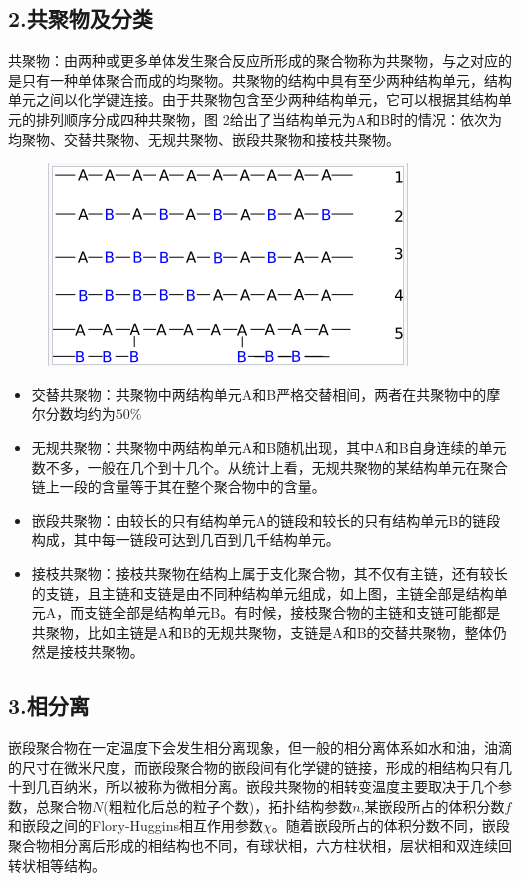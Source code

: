 \documentclass{article}
\begin{document}
\subsection{2.共聚物及分类}
共聚物\cite{Wikipedia}：由两种或更多单体发生聚合反应所形成的聚合物称为共聚物，与之对应的是只有一种单体聚合而成的均聚物。共聚物的结构中具有至少两种结构单元，结构单元之间以化学键连接。由于共聚物包含至少两种结构单元，它可以根据其结构单元的排列顺序分成四种共聚物，图 2给出了当结构单元为A和B时的情况：依次为均聚物、交替共聚物、无规共聚物、嵌段共聚物和接枝共聚物。

\begin{figure}[H]
\centering
\includegraphics[scale=0.5]{./figures/Figure_25.png}
\caption{}
\end{figure}
\begin{itemize}
\item 交替共聚物：共聚物中两结构单元A和B严格交替相间，两者在共聚物中的摩尔分数均约为$50\%$
\item 无规共聚物：共聚物中两结构单元A和B随机出现，其中A和B自身连续的单元数不多，一般在几个到十几个。从统计上看，无规共聚物的某结构单元在聚合链上一段的含量等于其在整个聚合物中的含量。
\item 嵌段共聚物：由较长的只有结构单元A的链段和较长的只有结构单元B的链段构成，其中每一链段可达到几百到几千结构单元。
\item 接枝共聚物：接枝共聚物在结构上属于支化聚合物，其不仅有主链，还有较长的支链，且主链和支链是由不同种结构单元组成，如上图，主链全部是结构单元A，而支链全部是结构单元B。有时候，接枝聚合物的主链和支链可能都是共聚物，比如主链是A和B的无规共聚物，支链是A和B的交替共聚物，整体仍然是接枝共聚物。
\end{itemize}
\subsection{3.相分离}
嵌段聚合物在一定温度下会发生相分离现象，但一般的相分离体系如水和油，油滴的尺寸在微米尺度，而嵌段聚合物的嵌段间有化学键的链接，形成的相结构只有几十到几百纳米，所以被称为微相分离。嵌段共聚物的相转变温度主要取决于几个参数，总聚合物$N$(粗粒化后总的粒子个数)，拓扑结构参数$n$,某嵌段所占的体积分数$f$和嵌段之间的Flory-Huggins相互作用参数$\chi$。随着嵌段所占的体积分数不同，嵌段聚合物相分离后形成的相结构也不同，有球状相，六方柱状相，层状相和双连续回转状相等结构。
\end{document}
